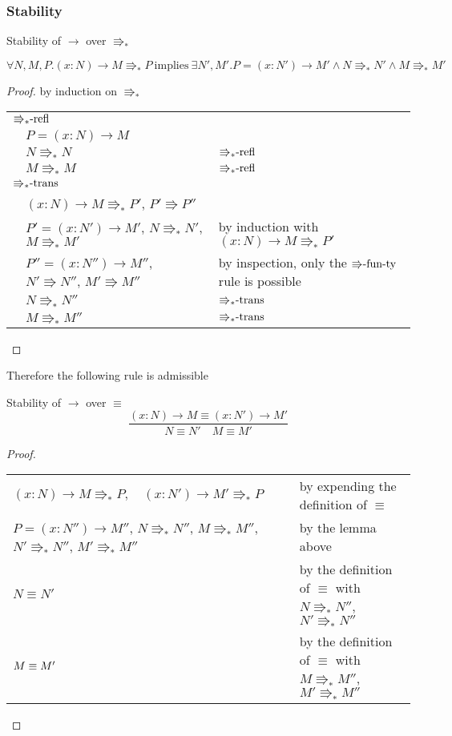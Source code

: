 \subsubsection{Stability}
\begin{lem}
Stability of $\rightarrow$ over $\Rrightarrow_{\ast}$

$\forall N,M,P.\left(x:N\right)\rightarrow M\Rrightarrow_{\ast}P\:\mathrm{implies}\:\exists N',M'.P=\left(x:N'\right)\rightarrow M'\land N\Rrightarrow_{\ast}N'\land M\Rrightarrow_{\ast}M'$
\end{lem}

\begin{proof}
by induction on $\Rrightarrow_{\ast}$

\begin{tabular}{lll}
\multicolumn{3}{l}{$\textrm{\ensuremath{\Rrightarrow_{\ast}}-refl}$}\tabularnewline
 & $P=\left(x:N\right)\rightarrow M$ & \tabularnewline
 & $N\Rrightarrow_{\ast}N$ & $\textrm{\ensuremath{\Rrightarrow_{\ast}}-refl}$\tabularnewline
 & $M\Rrightarrow_{\ast}M$ & $\textrm{\ensuremath{\Rrightarrow_{\ast}}-refl}$\tabularnewline
\multicolumn{3}{l}{$\textrm{\ensuremath{\Rrightarrow_{\ast}}-trans}$}\tabularnewline
 & $\left(x:N\right)\rightarrow M\Rrightarrow_{\ast}P'$, $P'\Rrightarrow P''$ & \tabularnewline
 & $P'=\left(x:N'\right)\rightarrow M'$, $N\Rrightarrow_{\ast}N'$,
$M\Rrightarrow_{\ast}M'$ & by induction with $\left(x:N\right)\rightarrow M\Rrightarrow_{\ast}P'$\tabularnewline
 & $P''=\left(x:N''\right)\rightarrow M''$, $N'\Rrightarrow N''$, $M'\Rrightarrow M''$ & by inspection, only the $\textrm{\ensuremath{\Rrightarrow}-fun-ty}$
rule is possible\tabularnewline
 & $N\Rrightarrow_{\ast}N''$ & $\textrm{\ensuremath{\Rrightarrow_{\ast}}-trans}$\tabularnewline
 & $M\Rrightarrow_{\ast}M''$ & $\textrm{\ensuremath{\Rrightarrow_{\ast}}-trans}$\tabularnewline
\end{tabular}
\end{proof}
Therefore the following rule is admissible
\begin{cor}
Stability of $\rightarrow$ over $\equiv$
\[
\frac{\left(x:N\right)\rightarrow M\equiv\left(x:N'\right)\rightarrow M'}{N\equiv N'\quad M\equiv M'}
\]
\end{cor}

\begin{proof}
\begin{tabular}{ll}
$\left(x:N\right)\rightarrow M\Rrightarrow_{\ast}P,\quad\left(x:N'\right)\rightarrow M'\Rrightarrow_{\ast}P$ & by expending the definition of $\equiv$\tabularnewline
$P=\left(x:N''\right)\rightarrow M''$, $N\Rrightarrow_{\ast}N''$,
$M\Rrightarrow_{\ast}M''$, $N'\Rrightarrow_{\ast}N''$, $M'\Rrightarrow_{\ast}M''$ & by the lemma above\tabularnewline
$N\equiv N'$ & by the definition of $\equiv$ with $N\Rrightarrow_{\ast}N''$, $N'\Rrightarrow_{\ast}N''$\tabularnewline
$M\equiv M'{\color{gray}}$ & by the definition of $\equiv$ with $M\Rrightarrow_{\ast}M''$, $M'\Rrightarrow_{\ast}M''$\tabularnewline
\end{tabular}
\end{proof}

